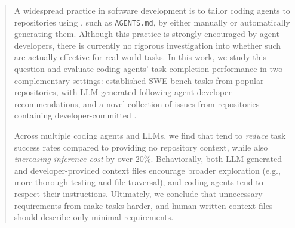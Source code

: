 \begin{abstract}
A widespread practice in software development is to tailor coding agents to repositories using \agentsmds{}, such as \texttt{AGENTS.md}, by either manually or automatically generating them. Although this practice is strongly encouraged by agent developers, there is currently no rigorous investigation into whether such \agentsmds{} are actually effective for real-world tasks. In this work, we study this question and evaluate coding agents' task completion performance in two complementary settings: established SWE-bench tasks from popular repositories, with LLM-generated \agentsmds{} following agent-developer recommendations, and a novel collection of issues from repositories containing developer-committed \agentsmds{}.

Across multiple coding agents and LLMs, we find that \agentsmds{} tend to \emph{reduce} task success rates compared to providing no repository context, while also \emph{increasing inference cost} by over 20\%. Behaviorally, both LLM-generated and developer-provided context files encourage broader exploration (e.g., more thorough testing and file traversal), and coding agents tend to respect their instructions. Ultimately, we conclude that unnecessary requirements from \agentsmds{} make tasks harder, and human-written context files should describe only minimal requirements.
\end{abstract}
